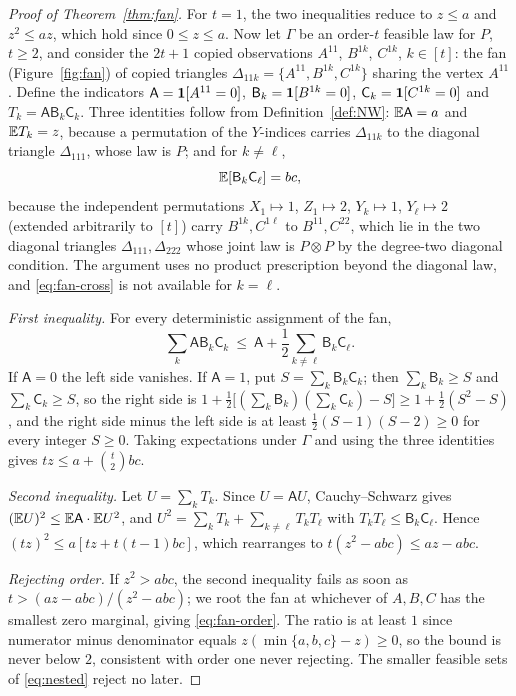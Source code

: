\begin{proof}[Proof of Theorem~\ref{thm:fan}]
For $t=1$, the two inequalities reduce to $z\le a$ and $z^2\le az$, which hold since $0\le z\le a$. Now let $\Gamma$ be an order-$t$ feasible law for $P$, $t\ge2$, and consider the $2t+1$ copied observations $A^{11}$, $B^{1k}$, $C^{1k}$, $k\in[t]$: the fan (Figure~\ref{fig:fan}) of copied triangles $\Delta_{11k}=\{A^{11},B^{1k},C^{1k}\}$ sharing the vertex $A^{11}$. Define the indicators $\mathsf A=\mathbf 1[A^{11}=0]$, $\mathsf B_k=\mathbf 1[B^{1k}=0]$, $\mathsf C_k=\mathbf 1[C^{1k}=0]$ and $T_k=\mathsf A\mathsf B_k\mathsf C_k$. Three identities follow from Definition~\ref{def:NW}: $\mathbb E\mathsf A=a$ and $\mathbb E T_k=z$, because a permutation of the $Y$-indices carries $\Delta_{11k}$ to the diagonal triangle $\Delta_{111}$, whose law is $P$; and for $k\ne\ell$,
\begin{equation}\label{eq:fan-cross}
\mathbb E[\mathsf B_k\mathsf C_\ell]=bc ,
\end{equation}
because the independent permutations $X_1\mapsto1$, $Z_1\mapsto2$, $Y_k\mapsto1$, $Y_\ell\mapsto2$ (extended arbitrarily to $[t]$) carry $B^{1k},C^{1\ell}$ to $B^{11},C^{22}$, which lie in the two diagonal triangles $\Delta_{111},\Delta_{222}$ whose joint law is $P\otimes P$ by the degree-two diagonal condition. The argument uses no product prescription beyond the diagonal law, and \eqref{eq:fan-cross} is not available for $k=\ell$.

\emph{First inequality.} For every deterministic assignment of the fan,
\begin{equation}\label{eq:fan-pointwise}
\sum_{k}\mathsf A\mathsf B_k\mathsf C_k\ \le\ \mathsf A+\frac12\sum_{k\ne\ell}\mathsf B_k\mathsf C_\ell .
\end{equation}
If $\mathsf A=0$ the left side vanishes. If $\mathsf A=1$, put $S=\sum_k\mathsf B_k\mathsf C_k$; then $\sum_k\mathsf B_k\ge S$ and $\sum_k\mathsf C_k\ge S$, so the right side is $1+\tfrac12\bigl[(\sum_k\mathsf B_k)(\sum_k\mathsf C_k)-S\bigr]\ge1+\tfrac12(S^2-S)$, and the right side minus the left side is at least $\tfrac12(S-1)(S-2)\ge0$ for every integer $S\ge0$. Taking expectations under $\Gamma$ and using the three identities gives $tz\le a+\binom t2bc$.

\emph{Second inequality.} Let $U=\sum_kT_k$. Since $U=\mathsf AU$, Cauchy--Schwarz gives $(\mathbb E U)^2\le\mathbb E\mathsf A\cdot\mathbb E U^2$, and $U^2=\sum_kT_k+\sum_{k\ne\ell}T_kT_\ell$ with $T_kT_\ell\le\mathsf B_k\mathsf C_\ell$. Hence $(tz)^2\le a[tz+t(t-1)bc]$, which rearranges to $t(z^2-abc)\le az-abc$.

\emph{Rejecting order.} If $z^2>abc$, the second inequality fails as soon as $t>(az-abc)/(z^2-abc)$; we root the fan at whichever of $A,B,C$ has the smallest zero marginal, giving \eqref{eq:fan-order}. The ratio is at least $1$ since numerator minus denominator equals $z(\min\{a,b,c\}-z)\ge0$, so the bound is never below $2$, consistent with order one never rejecting. The smaller feasible sets of \eqref{eq:nested} reject no later.
\end{proof}

